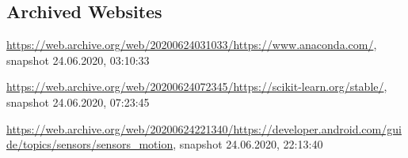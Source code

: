 \begin{appendices}





	


\section{Archived Websites}
\label{appendix:archivedWebsites}
\sloppy
\url{https://web.archive.org/web/20200624031033/https://www.anaconda.com/}, snapshot 24.06.2020, 03:10:33

\url{https://web.archive.org/web/20200624072345/https://scikit-learn.org/stable/}, snapshot 24.06.2020, 07:23:45

\url{https://web.archive.org/web/20200624221340/https://developer.android.com/guide/topics/sensors/sensors_motion}, snapshot 24.06.2020, 22:13:40


\end{appendices}
